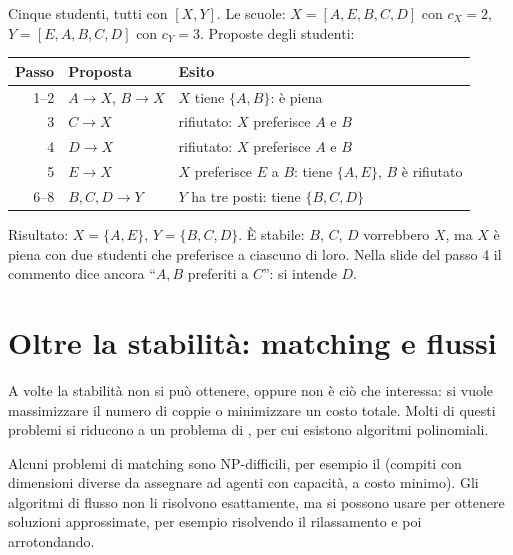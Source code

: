 \begin{esempio}
Cinque studenti, tutti con $[X, Y]$. Le scuole: $X = [A, E, B, C, D]$ con $c_X = 2$,
$Y = [E, A, B, C, D]$ con $c_Y = 3$. Proposte degli studenti:
\begin{center}
\renewcommand{\arraystretch}{1.15}
\begin{tabular}{rll}
\toprule
Passo & Proposta & Esito \\
\midrule
1--2 & $A \to X$, $B \to X$ & $X$ tiene $\{A, B\}$: è piena \\
3 & $C \to X$ & rifiutato: $X$ preferisce $A$ e $B$ \\
4 & $D \to X$ & rifiutato: $X$ preferisce $A$ e $B$ \\
5 & $E \to X$ & $X$ preferisce $E$ a $B$: tiene $\{A, E\}$, $B$ è rifiutato \\
6--8 & $B, C, D \to Y$ & $Y$ ha tre posti: tiene $\{B, C, D\}$ \\
\bottomrule
\end{tabular}
\end{center}
Risultato: $X = \{A, E\}$, $Y = \{B, C, D\}$. È stabile: $B$, $C$, $D$ vorrebbero $X$, ma
$X$ è piena con due studenti che preferisce a ciascuno di loro. Nella slide del passo 4 il
commento dice ancora ``$A, B$ preferiti a $C$'': si intende $D$.
\end{esempio}

\section{Oltre la stabilità: matching e flussi}

A volte la stabilità non si può ottenere, oppure non è ciò che interessa: si vuole
massimizzare il numero di coppie o minimizzare un costo totale. Molti di questi problemi si
riducono a un problema di , per cui esistono algoritmi polinomiali.

\begin{attenzione}
Alcuni problemi di matching sono NP-difficili, per esempio il 
(compiti con dimensioni diverse da assegnare ad agenti con capacità, a costo minimo). Gli
algoritmi di flusso non li risolvono esattamente, ma si possono usare per ottenere soluzioni
approssimate, per esempio risolvendo il rilassamento e poi arrotondando.
\end{attenzione}

